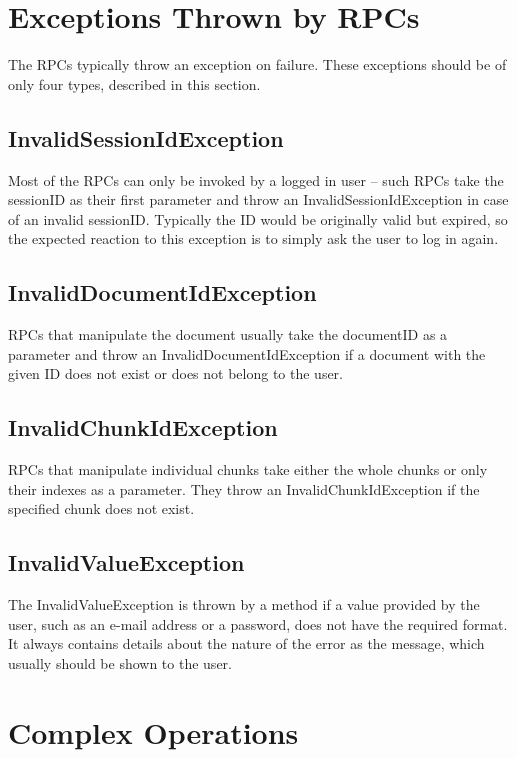 \section{Exceptions Thrown by RPCs}

The RPCs typically throw an exception on failure. These exceptions should be of only four types, described in this section.

\subsection{InvalidSessionIdException}

Most of the RPCs can only be invoked by a logged in user -- such RPCs take the sessionID as their first parameter and throw an InvalidSessionIdException in case of an invalid sessionID. Typically the ID would be originally valid but expired, so the expected reaction to this exception is to simply ask the user to log in again.

\subsection{InvalidDocumentIdException}

RPCs that manipulate the document usually take the documentID as a parameter and throw an InvalidDocumentIdException if a document with the given ID does not exist or does not belong to the user.

\subsection{InvalidChunkIdException}

RPCs that manipulate individual chunks take either the whole chunks or only their indexes as a parameter. They throw an InvalidChunkIdException if the specified chunk does not exist.

\subsection{InvalidValueException}

The InvalidValueException is thrown by a method if a value provided by the user, such as an e-mail address or a password, does not have the required format. It always contains details about the nature of the error as the message, which usually should be shown to the user.

\section{Complex Operations}

